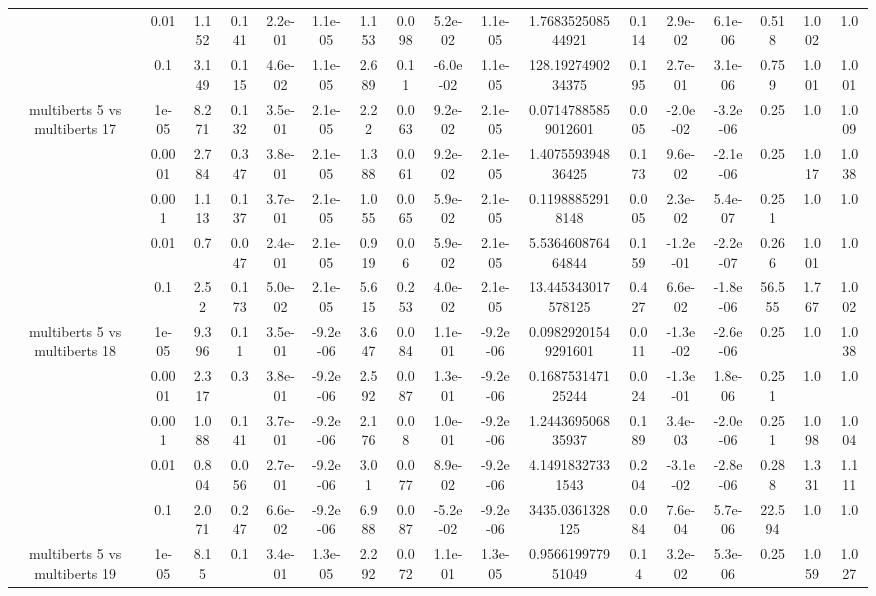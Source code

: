 \begin{tabular}{|c|c|c|c|c|c|c|c|c|c|c|c|c|c|c|c|c|}
 & 0.01 & 1.152 & 0.141 & 2.2e-01 & 1.1e-05 & 1.153 & 0.098 & 5.2e-02 & 1.1e-05 & 1.768352508544921 & 0.114 & 2.9e-02 & 6.1e-06 & 0.518 & 1.002 & 1.0 \\
 & 0.1 & 3.149 & 0.115 & 4.6e-02 & 1.1e-05 & 2.689 & 0.11 & -6.0e-02 & 1.1e-05 & 128.1927490234375 & 0.195 & 2.7e-01 & 3.1e-06 & 0.759 & 1.001 & 1.001 \\
\hline
\multirow{5}{*}{multiberts 5 vs multiberts 17} & 1e-05 & 8.271 & 0.132 & 3.5e-01 & 2.1e-05 & 2.22 & 0.063 & 9.2e-02 & 2.1e-05 & 0.07147885859012601 & 0.005 & -2.0e-02 & -3.2e-06 & 0.25 & 1.0 & 1.009 \\
 & 0.0001 & 2.784 & 0.347 & 3.8e-01 & 2.1e-05 & 1.388 & 0.061 & 9.2e-02 & 2.1e-05 & 1.407559394836425 & 0.173 & 9.6e-02 & -2.1e-06 & 0.25 & 1.017 & 1.038 \\
 & 0.001 & 1.113 & 0.137 & 3.7e-01 & 2.1e-05 & 1.055 & 0.065 & 5.9e-02 & 2.1e-05 & 0.11988852918148 & 0.005 & 2.3e-02 & 5.4e-07 & 0.251 & 1.0 & 1.0 \\
 & 0.01 & 0.7 & 0.047 & 2.4e-01 & 2.1e-05 & 0.919 & 0.06 & 5.9e-02 & 2.1e-05 & 5.536460876464844 & 0.159 & -1.2e-01 & -2.2e-07 & 0.266 & 1.001 & 1.0 \\
 & 0.1 & 2.52 & 0.173 & 5.0e-02 & 2.1e-05 & 5.615 & 0.253 & 4.0e-02 & 2.1e-05 & 13.445343017578125 & 0.427 & 6.6e-02 & -1.8e-06 & 56.555 & 1.767 & 1.002 \\
\hline
\multirow{5}{*}{multiberts 5 vs multiberts 18} & 1e-05 & 9.396 & 0.11 & 3.5e-01 & -9.2e-06 & 3.647 & 0.084 & 1.1e-01 & -9.2e-06 & 0.09829201549291601 & 0.011 & -1.3e-02 & -2.6e-06 & 0.25 & 1.0 & 1.038 \\
 & 0.0001 & 2.317 & 0.3 & 3.8e-01 & -9.2e-06 & 2.592 & 0.087 & 1.3e-01 & -9.2e-06 & 0.168753147125244 & 0.024 & -1.3e-01 & 1.8e-06 & 0.251 & 1.0 & 1.0 \\
 & 0.001 & 1.088 & 0.141 & 3.7e-01 & -9.2e-06 & 2.176 & 0.08 & 1.0e-01 & -9.2e-06 & 1.244369506835937 & 0.189 & 3.4e-03 & -2.0e-06 & 0.251 & 1.098 & 1.004 \\
 & 0.01 & 0.804 & 0.056 & 2.7e-01 & -9.2e-06 & 3.01 & 0.077 & 8.9e-02 & -9.2e-06 & 4.14918327331543 & 0.204 & -3.1e-02 & -2.8e-06 & 0.288 & 1.331 & 1.111 \\
 & 0.1 & 2.071 & 0.247 & 6.6e-02 & -9.2e-06 & 6.988 & 0.087 & -5.2e-02 & -9.2e-06 & 3435.0361328125 & 0.084 & 7.6e-04 & 5.7e-06 & 22.594 & 1.0 & 1.0 \\
\hline
\multirow{5}{*}{multiberts 5 vs multiberts 19} & 1e-05 & 8.15 & 0.1 & 3.4e-01 & 1.3e-05 & 2.292 & 0.072 & 1.1e-01 & 1.3e-05 & 0.956619977951049 & 0.14 & 3.2e-02 & 5.3e-06 & 0.25 & 1.059 & 1.027 \\

\end{tabular}
